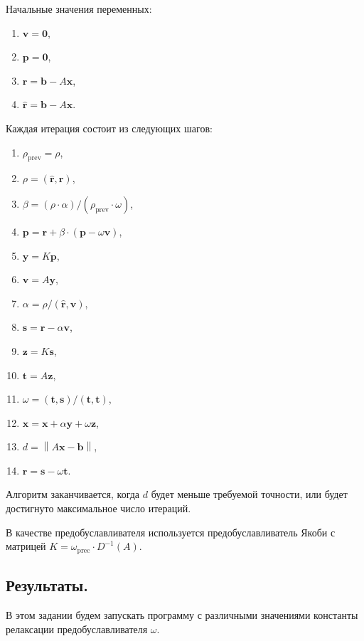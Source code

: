 \documentclass[12pt]{article}
\begin{document}
Начальные значения переменных:

\begin{enumerate}
\item $\mathbf v = \mathbf 0$,
\item $\mathbf p = \mathbf 0$,
\item $\mathbf r = \mathbf b - A \mathbf x$,
\item $\mathbf{\hat r} = \mathbf b - A \mathbf x$.
\end{enumerate}

Каждая итерация состоит из следующих шагов:
\begin{enumerate}
\item $\rho_\text{prev} = \rho$,
\item $\rho = (\mathbf{\hat r}, \mathbf r)$,
\item $\beta = (\rho \cdot \alpha) / (\rho_\text{prev} \cdot \omega)$,
\item $\mathbf p = \mathbf r + \beta \cdot (\mathbf p - \omega \mathbf v)$,
\item $\mathbf y = K \mathbf p$,
\item $\mathbf v = A \mathbf y$,
\item $\alpha = \rho / (\mathbf{\hat r}, \mathbf v)$,
\item $\mathbf s = \mathbf r - \alpha \mathbf v$,
\item $\mathbf z = K \mathbf s$,
\item $\mathbf t = A \mathbf z$,
\item $\omega = (\mathbf t, \mathbf s) / (\mathbf t, \mathbf t)$,
\item $\mathbf x = \mathbf x + \alpha \mathbf y + \omega \mathbf z$,
\item $d = \left\|A \mathbf x - \mathbf b\right\|$,
\item $\mathbf r = \mathbf s - \omega \mathbf t$.
\end{enumerate}
Алгоритм заканчивается, когда $d$ будет меньше требуемой точности, или будет
достигнуто максимальное число итераций.

В качестве предобуславливателя используется предобуславливатель Якоби
с матрицей $K = \omega_\text{prec} \cdot D^{-1}(A)$.

\subsection{Результаты.}

В этом задании будем запускать программу с различными значениями константы релаксации пред\-обуслав\-ливателя $\omega$.
\end{document}
